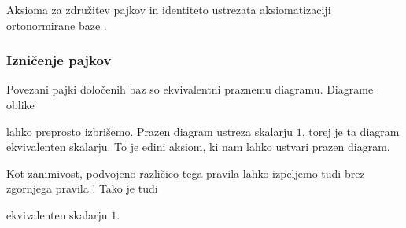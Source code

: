 \documentclass[mat1]{fmfdelo}
\begin{document}
Aksioma za združitev pajkov in identiteto ustrezata aksiomatizaciji ortonormirane baze \cite[poglavje 5]{coecke_pavlovic_vicary_2013}.

\subsubsection{Izničenje pajkov} \label{iznicenje}
Povezani pajki določenih baz so ekvivalentni praznemu diagramu. Diagrame oblike
\begin{center}
\end{center}
lahko preprosto izbrišemo. Prazen diagram ustreza skalarju \(1\), torej je ta diagram ekvivalenten skalarju. To je edini aksiom, ki nam lahko ustvari prazen diagram.

Kot zanimivost, podvojeno različico tega pravila lahko izpeljemo tudi brez zgornjega pravila \cite[poglavje 3.1]{jeandel_et_al}! Tako je tudi
\begin{center}
\end{center}
ekvivalenten skalarju \(1\).
\end{document}
